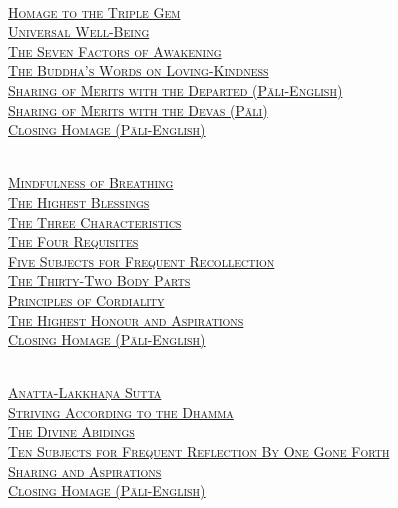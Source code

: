 \begin{center}
  \clearpage

  {\libertinusFont\selectfont\textbf{\textsc{}}}\\

  \textsc{
    \hyperref[dedication-of-offerings]{Homage to the Triple Gem}\\
    \hyperref[universal-well-being]{Universal Well-Being}\\
    \hyperref[seven-factors-of-awakening]{The Seven Factors of Awakening}\\
    \hyperref[words-on-loving-kindness]{The Buddha’s Words on Loving-Kindness}\\
    \hyperref[sharing-merits-departed]{Sharing of Merits with the Departed (Pāli-English)}\\
    \hyperref[sharing-merits-devas]{Sharing of Merits with the Devas (Pāli)}\\
    \hyperref[closing-homage]{Closing Homage (Pāli-English)}}\\

  \bigskip

  {\libertinusFont\selectfont\textbf{\textsc{}}}\\

  \textsc{
    \hyperref[mindfulness-of-breathing]{Mindfulness of Breathing}\\
    \hyperref[highest-blessings]{The Highest Blessings}\\
    \hyperref[three-characteristics]{The Three Characteristics}\\
    \hyperref[four-requisites]{The Four Requisites}\\
    \hyperref[five-recollections]{Five Subjects for Frequent Recollection}\\
    \hyperref[32-parts]{The Thirty-Two Body Parts}\\
    \hyperref[principles-of-cordiality]{Principles of Cordiality}\\
    \hyperref[highest-honour-aspirations]{The Highest Honour and Aspirations}\\
    \hyperref[closing-homage]{Closing Homage (Pāli-English)}}\\

  \bigskip

  {\libertinusFont\selectfont\textbf{\textsc{}}}\\

  \textsc{
    \hyperref[anatta-lakkhana]{Anatta-Lakkhaṇa Sutta}\\
    \hyperref[striving-according-to-dhamma]{Striving According to the Dhamma}\\
    \hyperref[divine-abidings]{The Divine Abidings}\\
    \hyperref[ten-recollections]{Ten Subjects for Frequent Reflection By One Gone Forth}\\
    \hyperref[sharing-aspirations]{Sharing and Aspirations}\\
    \hyperref[closing-homage]{Closing Homage (Pāli-English)}}\\


\end{center}
